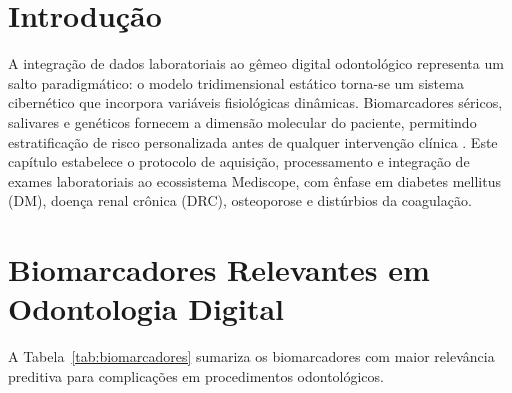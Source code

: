 
\section{Introdução}
\label{sec:lab-introducao}

A integração de dados laboratoriais ao gêmeo digital odontológico representa um salto paradigmático: o modelo tridimensional estático torna-se um sistema cibernético que incorpora variáveis fisiológicas dinâmicas. Biomarcadores séricos, salivares e genéticos fornecem a dimensão molecular do paciente, permitindo estratificação de risco personalizada antes de qualquer intervenção clínica \cite{lipi2022salivary}. Este capítulo estabelece o protocolo de aquisição, processamento e integração de exames laboratoriais ao ecossistema Mediscope, com ênfase em diabetes mellitus (DM), doença renal crônica (DRC), osteoporose e distúrbios da coagulação.

\section{Biomarcadores Relevantes em Odontologia Digital}
\label{sec:biomarcadores}

A Tabela~\ref{tab:biomarcadores} sumariza os biomarcadores com maior relevância preditiva para complicações em procedimentos odontológicos.

